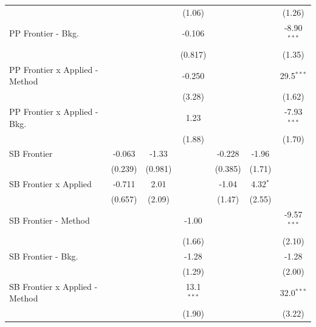\begin{tabular}{lcccccc}
                                  &               &              & (1.06)        &         &               & (1.26)\\   
   PP Frontier - Bkg.             &               &              & -0.106        &         &               & -8.90$^{***}$\\   
                                  &               &              & (0.817)       &         &               & (1.35)\\   
   PP Frontier x Applied - Method &               &              & -0.250        &         &               & 29.5$^{***}$\\   
                                  &               &              & (3.28)        &         &               & (1.62)\\   
   PP Frontier x Applied - Bkg.   &               &              & 1.23          &         &               & -7.93$^{***}$\\   
                                  &               &              & (1.88)        &         &               & (1.70)\\   
   SB Frontier                    & -0.063        & -1.33        &               & -0.228  & -1.96         &   \\   
                                  & (0.239)       & (0.981)      &               & (0.385) & (1.71)        &   \\   
   SB Frontier x Applied          & -0.711        & 2.01         &               & -1.04   & 4.32$^{*}$    &   \\   
                                  & (0.657)       & (2.09)       &               & (1.47)  & (2.55)        &   \\   
   SB Frontier - Method           &               &              & -1.00         &         &               & -9.57$^{***}$\\   
                                  &               &              & (1.66)        &         &               & (2.10)\\   
   SB Frontier - Bkg.             &               &              & -1.28         &         &               & -1.28\\   
                                  &               &              & (1.29)        &         &               & (2.00)\\   
   SB Frontier x Applied - Method &               &              & 13.1$^{***}$  &         &               & 32.0$^{***}$\\   
                                  &               &              & (1.90)        &         &               & (3.22)\\   

\end{tabular}
